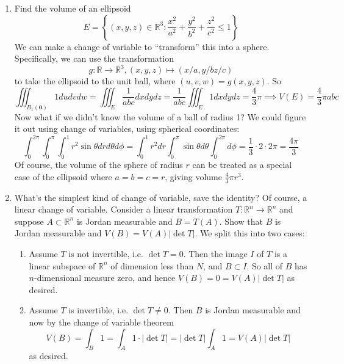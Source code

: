 \documentclass{article}
\newcommand{\reals}[0]{\mathbb{R}}
\newcommand{\mb}[1]{\mathbf{#1}}
\begin{document}
\begin{enumerate}

  \item Find the volume of an ellipsoid
  \begin{equation}
    E = \left\{(x, y, z) \in \reals^3 : \frac{x^2}{a^2} + \frac{y^2}{b^2} + \frac{z^2}{c^2} \leq 1\right\}
  \end{equation}
  We can make a change of variable to ``transform'' this into a sphere. Specifically, we can use the transformation
  \begin{equation}
    g : \reals \to \reals^3, (x, y, z) \mapsto (x/a, y/b z/c)
  \end{equation}
  to take the ellipsoid to the unit ball, where \((u, v, w) = g(x, y, z)\). So
  \begin{equation}
    \iiint_{B_1(\mb{0})}1dudvdw = \iiint_{E}\frac{1}{abc}dxdydz = \frac{1}{abc}\iiint_{E}1dxdydz = \frac{4}{3}\pi \implies V(E) = \frac{4}{3}\pi abc
  \end{equation}
  Now what if we didn't know the volume of a ball of radius 1? We could figure it out using change of variables, using spherical coordinates:
  \begin{equation}
    \int_{0}^{2\pi}\int_{0}^{\pi}\int_0^1r^2\sin\theta drd\theta d\phi = \int_0^1r^2dr\int_0^\pi\sin\theta d\theta\int_0^{2\pi}d\phi = \frac{1}{3} \cdot 2 \cdot 2\pi = \frac{4\pi}{3}
  \end{equation}
  Of course, the volume of the sphere of radius \(r\) can be treated as a special case of the ellipsoid where \(a = b = c = r\), giving volume \(\frac{4}{3}\pi r^3\).

  \item What's the simplest kind of change of variable, save the identity? Of course, a linear change of variable. Consider a linear transformation \(T: \reals^n \to \reals^n\) and suppose \(A \subset \reals^n\) is Jordan measurable and \(B = T(A)\). Show that \(B\) is Jordan measurable and \(V(B) = V(A)|\det T|\). We split this into two cases:
  \begin{enumerate}

    \item Assume \(T\) is not invertible, i.e. \(\det T = 0\). Then the image \(I\) of \(T\) is a linear subspace of \(\reals^n\) of dimension less than \(N\), and \(B \subset I\). So all of \(B\) has \(n\)-dimensional measure zero, and hence \(V(B) = 0 = V(A)|\det T|\) as desired.

    \item Assume \(T\) is invertible, i.e. \(\det T \neq 0\). Then \(B\) is Jordan measurable and now by the change of variable theorem
    \begin{equation}
      V(B) = \int_B1 = \int_A1 \cdot |\det T| = |\det T|\int_A1 = V(A)|\det T|
    \end{equation}
    as desired.

  \end{enumerate}

\end{enumerate}
\end{document}
